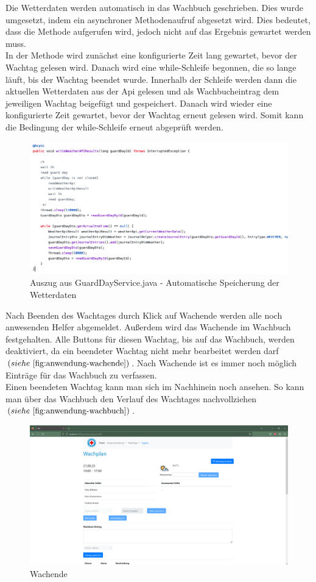 \documentclass[fontsize=12pt,openright,oneside,paper=a4,BCOR=1cm]{scrbook}
\begin{document}
Die Wetterdaten werden automatisch in das Wachbuch geschrieben. Dies wurde umgesetzt, indem ein asynchroner Methodenaufruf abgesetzt wird. Dies bedeutet, dass die Methode aufgerufen wird, jedoch nicht auf das Ergebnis gewartet werden muss. \\
In der Methode wird zun\"achst eine konfigurierte Zeit lang gewartet, bevor der Wachtag gelesen wird. Danach wird eine while-Schleife begonnen, die so lange l\"auft, bis der Wachtag beendet wurde. Innerhalb der Schleife werden dann die aktuellen Wetterdaten aus der Api gelesen und als Wachbucheintrag dem jeweiligen Wachtag beigef\"ugt und gespeichert. Danach wird wieder eine konfigurierte Zeit gewartet, bevor der Wachtag erneut gelesen wird. Somit kann die Bedingung der while-Schleife erneut abgepr\"uft werden. 

\begin{figure}[H]
  \centering
    \includegraphics[width=0.8\linewidth]{Anlagen/Code/weatherApiAsync.png}
    \caption{Auszug aus GuardDayService.java - Automatische Speicherung der Wetterdaten}
  \label{fig:code-weatherapi}
\end{figure}
 
Nach Beenden des Wachtages durch Klick auf \glqq Wachende\grqq{} werden alle noch anwesenden Helfer abgemeldet. Au{\ss}erdem wird das Wachende im Wachbuch festgehalten. Alle Buttons f\"ur diesen Wachtag, bis auf das Wachbuch, werden deaktiviert, da ein beendeter Wachtag nicht mehr bearbeitet werden darf $(siehe~\ref{fig:anwendung-wachende})$. Nach Wachende ist es immer noch möglich Einträge für das Wachbuch zu verfassen.\\
Einen beendeten Wachtag kann man sich im Nachhinein noch ansehen. So kann man \"uber das Wachbuch den Verlauf des Wachtages nachvollziehen $(siehe~\ref{fig:anwendung-wachbuch})$.

\begin{figure}[H]
  \centering
    \includegraphics[width=0.8\linewidth]{Anlagen/Anwendung/8-5WachtagWachende.png}
    \caption{Wachende}
  \label{fig:anwendung-wachende}
\end{figure}
\end{document}
